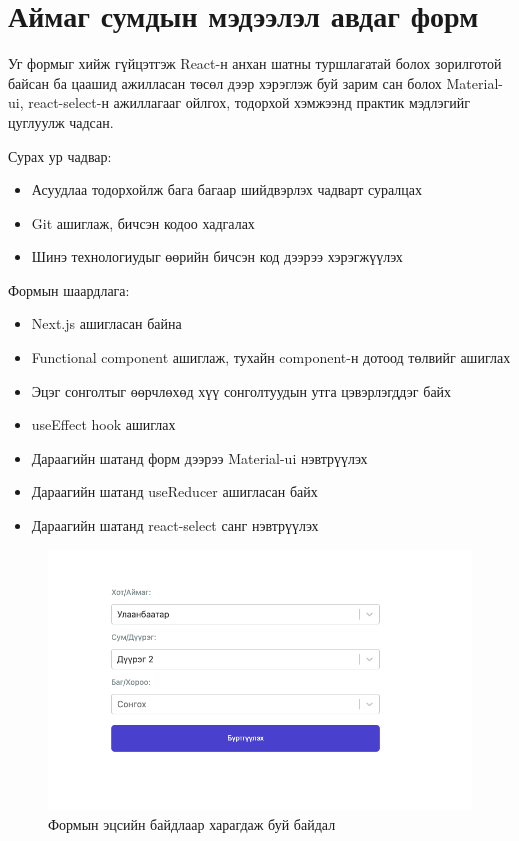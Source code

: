 
\section{Аймаг сумдын мэдээлэл авдаг форм}

Уг формыг хийж гүйцэтгэж React-н анхан шатны туршлагатай болох зорилготой байсан ба цаашид ажилласан төсөл дээр хэрэглэж буй зарим сан болох Material-ui, react-select-н ажиллагааг ойлгох, тодорхой хэмжээнд практик мэдлэгийг цуглуулж чадсан. 

Сурах ур чадвар: 
\begin{itemize}
    \item Асуудлаа тодорхойлж бага багаар шийдвэрлэх чадварт суралцах
    \item Git ашиглаж, бичсэн кодоо хадгалах
    \item Шинэ технологиудыг өөрийн бичсэн код дээрээ хэрэгжүүлэх
\end{itemize}

Формын шаардлага: 
\begin{itemize}
    \item Next.js ашигласан байна
    \item Functional component ашиглаж, тухайн component-н дотоод төлвийг ашиглах
    \item Эцэг сонголтыг өөрчлөхөд хүү сонголтуудын утга цэвэрлэгддэг байх
    \item useEffect hook ашиглах
    \item Дараагийн шатанд форм дээрээ Material-ui нэвтрүүлэх
    \item Дараагийн шатанд useReducer ашигласан байх
    \item Дараагийн шатанд react-select санг нэвтрүүлэх
\end{itemize}

\begin{figure}
    \centering
    \includegraphics[width=15cm]{images/form.png}
    \caption{Формын эцсийн байдлаар харагдаж буй байдал}
    \label{fig:my_label}
\end{figure}
